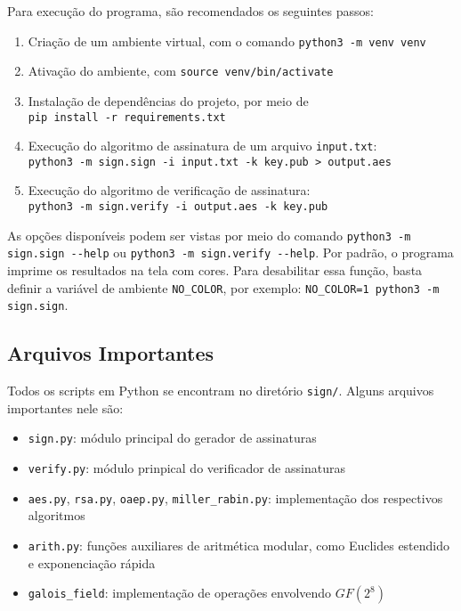 \documentclass[a4paper, 10.5pt]{article}
\begin{document}
    Para execução do programa, são recomendados os seguintes passos:
    \begin{enumerate}
        \item Criação de um ambiente virtual, com o comando \verb|python3 -m venv venv|
        \item Ativação do ambiente, com \verb|source venv/bin/activate|
        \item Instalação de dependências do projeto, por meio de \\ \verb|pip install -r requirements.txt|
        \item Execução do algoritmo de assinatura de um arquivo
            \verb|input.txt|: \\ \verb|python3 -m sign.sign -i input.txt -k key.pub > output.aes|
        \item Execução do algoritmo de verificação de assinatura: \\
            \verb|python3 -m sign.verify -i output.aes -k key.pub|
    \end{enumerate}

    As opções disponíveis podem ser vistas por meio do comando \verb|python3 -m sign.sign --help| ou \verb|python3 -m sign.verify --help|.
    Por padrão, o programa imprime os resultados na tela com cores. Para
    desabilitar essa função, basta definir a variável de ambiente
    \verb|NO_COLOR|, por exemplo: \verb|NO_COLOR=1 python3 -m sign.sign|.

\subsection{Arquivos Importantes} %
\label{sec:arquivos}
    Todos os scripts em Python se encontram no diretório \verb|sign/|. Alguns
    arquivos importantes nele são:
    \begin{itemize}
        \item \verb|sign.py|: módulo principal do gerador de assinaturas
        \item \verb|verify.py|: módulo prinpical do verificador de assinaturas
        \item \verb|aes.py|, \verb|rsa.py|, \verb|oaep.py|,
            \verb|miller_rabin.py|: implementação dos respectivos algoritmos
        \item \verb|arith.py|: funções auxiliares de aritmética modular, como
            Euclides estendido e exponenciação rápida
        \item \verb|galois_field|: implementação de operações envolvendo
            $GF(2^8)$
    \end{itemize}
\end{document}
